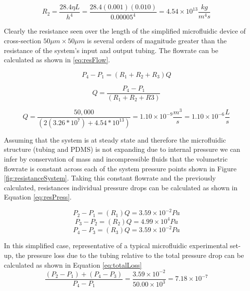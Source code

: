 \begin{equation}
R_2 = \frac{28.4 \eta L}{ h^4}= \frac{28.4 (0.001) (0.010)}{ 0.00005^4} = 4.54 \times 10^{13}\frac{kg}{m^4s}
\label{eq:resSquare}
\end{equation}


Clearly the resistance seen over the length of the simplified microfluidic device of cross-section $50 \mu m \times 50 \mu m$ is several orders of magnitude greater than the resistance of the system's input and output tubing. The flowrate can be calculated as shown in \vref{eq:resFlow}.

\begin{equation*}
P_4 - P_1 = (R_1 + R_2 + R_3) Q
\end{equation*}

\begin{equation*}
Q = \frac{P_4 - P_1 }{(R_1 + R_2 + R3)}
\end{equation*}

\begin{equation}
Q = \frac{50,000}{(2 (3.26*10^7) + 4.54*10^{13})} = 1.10  \times 10^{-9} \frac{m^3}{s} = 1.10  \times 10^{-6} \frac{L}{s}
\label{eq:resFlow}
\end{equation}

Assuming that the system is at steady state and therefore the microfluidic structure (tubing and PDMS) is not expanding due to internal pressure we can infer by conservation of mass and incompressible fluids that the volumetric flowrate is constant across each of the system pressure points shown in Figure \vref{fig:resistanceSystem}. Taking this constant flowrate and the previously calculated, resistances individual pressure drops can be calculated as shown in Equation \vref{eq:resPress}.

\begin{equation*}
P_2 - P_1 = (R_1) Q = 3.59 \times 10^{-2} Pa
\end{equation*}
\begin{equation*}
P_3- P_2 = (R_2)Q = 4.99 \times 10^{4 }Pa
\end{equation*}
\begin{equation}
P_4 - P_3 = (R_3) Q = 3.59 \times 10^{-2} Pa
\label{eq:resPress}
\end{equation}

In this simplified case, representative of a typical microfluidic experimental set-up, the pressure loss due to the tubing relative to the total pressure drop can be calculated as shown in Equation \vref{eq:totalLoss}
\begin{equation}
\frac{(P_2-P_1)+(P_4-P_3)}{P_4-P_1} = \frac{3.59 \times 10^{-2}}{50.00 \times 10^{3}} = 7.18 \times 10^{-7}
\label{eq:totalLoss}
\end{equation}

